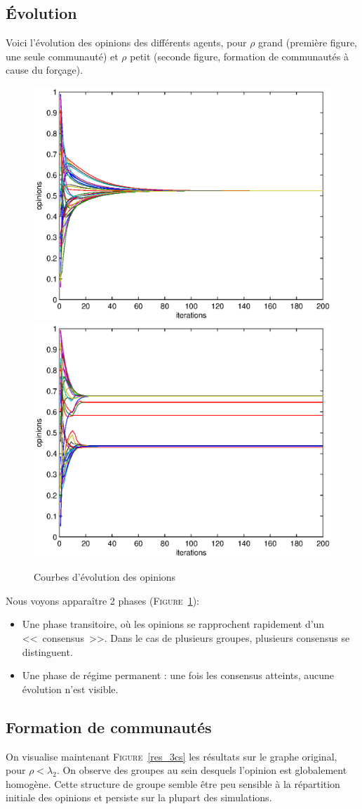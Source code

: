 \documentclass[12pt]{article}
\newcommand{\fig}[1]{\textsc{Figure}~\ref{#1}}
\begin{document}
\subsection{Évolution}

Voici l'évolution des opinions des différents agents, pour $\rho$
grand (première figure, une seule communauté) et $\rho$ petit (seconde
figure, formation de communautés à cause du forçage).

\begin{figure}[htb]
	\begin{center}
		\includegraphics[width=.4\textwidth]{evolution_ok}
		\includegraphics[width=.4\textwidth]{evolution_clusters}
	\end{center}
	\caption{Courbes d'évolution des opinions}
	\label{fig:evol}
\end{figure}

Nous voyons apparaître 2 phases (\fig{fig:evol}):
\begin{itemize}
	\item Une phase transitoire, où les opinions se rapprochent rapidement d'un <<~consensus~>>.
		Dans le cas de plusieurs groupes, plusieurs consensus se distinguent.
	\item Une phase de régime permanent : une fois les consensus atteints, aucune évolution n'est visible.
\end{itemize}


\subsection{Formation de communautés}
On visualise maintenant \fig{res_3cs} les résultats sur le graphe original, pour
$\rho < \lambda_2$. On observe des groupes au sein desquels l'opinion
est globalement homogène. Cette structure de groupe semble être peu
sensible à la répartition initiale des opinions et persiste
sur la plupart des simulations.
\end{document}
